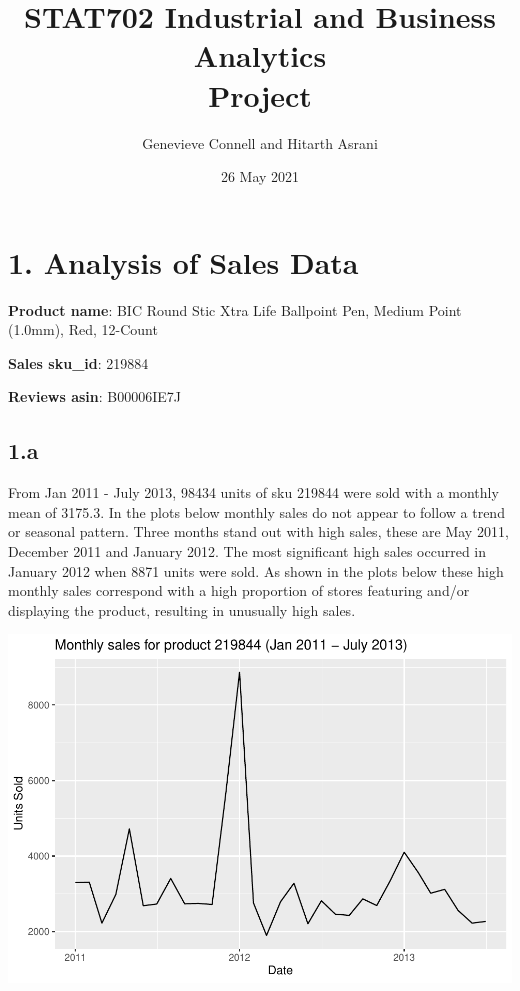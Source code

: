 \documentclass[
  11pt,
]{article}
\title{STAT702 Industrial and Business Analytics\\
Project}
\author{Genevieve Connell and Hitarth Asrani}
\date{26 May 2021}
\begin{document}
\maketitle

\newpage

\hypertarget{analysis-of-sales-data}{%
\section{1. Analysis of Sales Data}\label{analysis-of-sales-data}}

\textbf{Product name}: BIC Round Stic Xtra Life Ballpoint Pen, Medium
Point (1.0mm), Red, 12-Count

\textbf{Sales sku\_id}: 219884

\textbf{Reviews asin}: B00006IE7J

\hypertarget{a}{%
\subsection{1.a}\label{a}}

From Jan 2011 - July 2013, 98434 units of sku 219844 were sold with a
monthly mean of 3175.3. In the plots below monthly sales do not appear
to follow a trend or seasonal pattern. Three months stand out with high
sales, these are May 2011, December 2011 and January 2012. The most
significant high sales occurred in January 2012 when 8871 units were
sold. As shown in the plots below these high monthly sales correspond
with a high proportion of stores featuring and/or displaying the
product, resulting in unusually high sales.

\includegraphics[width=0.75\linewidth]{Assignment-STAT702---final_files/figure-latex/1a monthly sales plot-1}
\end{document}
